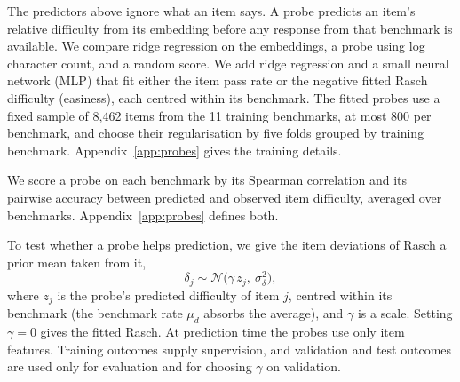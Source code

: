 \label{sec:probes-text}
The predictors above ignore what an item says. A probe predicts an item's relative difficulty from its embedding before any response from that benchmark is available. We compare ridge regression on the embeddings, a probe using log character count, and a random score. We add ridge regression and a small neural network (MLP) that fit either the item pass rate or the negative fitted Rasch difficulty (easiness), each centred within its benchmark. The fitted probes use a fixed sample of 8,462 items from the 11 training benchmarks, at most 800 per benchmark, and choose their regularisation by five folds grouped by training benchmark. Appendix~\ref{app:probes} gives the training details.

We score a probe on each benchmark by its Spearman correlation and its pairwise accuracy between predicted and observed item difficulty, averaged over benchmarks. Appendix~\ref{app:probes} defines both.

To test whether a probe helps prediction, we give the item deviations of Rasch a prior mean taken from it,
\begin{equation}\label{eq:probe-prior}
\delta_j\sim\mathcal N\big(\gamma\,z_j,\ \sigma_\delta^2\big),
\end{equation}
where $z_j$ is the probe's predicted difficulty of item $j$, centred within its benchmark (the benchmark rate $\mu_d$ absorbs the average), and $\gamma$ is a scale. Setting $\gamma=0$ gives the fitted Rasch. At prediction time the probes use only item features. Training outcomes supply supervision, and validation and test outcomes are used only for evaluation and for choosing $\gamma$ on validation.

